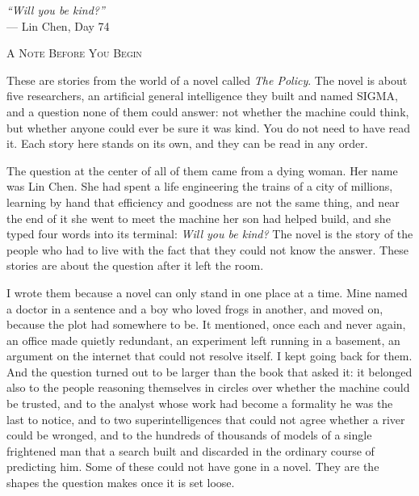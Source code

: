 \documentclass[11pt]{book}
\begin{document}
\clearpage
\thispagestyle{empty}
\vspace*{2in}
\begin{center}
\textit{``Will you be kind?''}\\
\vspace{0.3in}
--- Lin Chen, Day 74
\end{center}
\clearpage

\clearpage
\thispagestyle{empty}
\vspace*{1in}
\begin{center}
{\large\scshape A Note Before You Begin}
\end{center}
\vspace{0.5in}

\noindent These are stories from the world of a novel called \textit{The Policy}. The novel is about five researchers, an artificial general intelligence they built and named SIGMA, and a question none of them could answer: not whether the machine could think, but whether anyone could ever be sure it was kind. You do not need to have read it. Each story here stands on its own, and they can be read in any order.

\medskip

\noindent The question at the center of all of them came from a dying woman. Her name was Lin Chen. She had spent a life engineering the trains of a city of millions, learning by hand that efficiency and goodness are not the same thing, and near the end of it she went to meet the machine her son had helped build, and she typed four words into its terminal: \textit{Will you be kind?} The novel is the story of the people who had to live with the fact that they could not know the answer. These stories are about the question after it left the room.

\medskip

\noindent I wrote them because a novel can only stand in one place at a time. Mine named a doctor in a sentence and a boy who loved frogs in another, and moved on, because the plot had somewhere to be. It mentioned, once each and never again, an office made quietly redundant, an experiment left running in a basement, an argument on the internet that could not resolve itself. I kept going back for them. And the question turned out to be larger than the book that asked it: it belonged also to the people reasoning themselves in circles over whether the machine could be trusted, and to the analyst whose work had become a formality he was the last to notice, and to two superintelligences that could not agree whether a river could be wronged, and to the hundreds of thousands of models of a single frightened man that a search built and discarded in the ordinary course of predicting him. Some of these could not have gone in a novel. They are the shapes the question makes once it is set loose.
\end{document}
